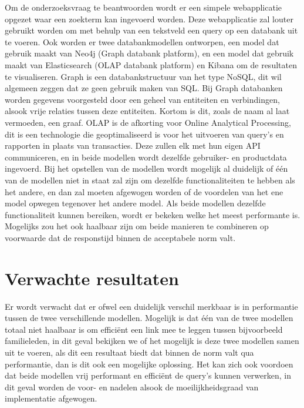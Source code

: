 Om de onderzoeksvraag te beantwoorden wordt er een simpele webapplicatie opgezet waar een zoekterm kan ingevoerd worden. Deze webapplicatie zal louter gebruikt worden om met behulp van een tekstveld een query op een databank uit te voeren. Ook worden er twee databankmodellen ontworpen, een model dat gebruik maakt van Neo4j (Graph databank platform), en een model dat gebruik maakt van Elasticsearch (OLAP databank platform) en Kibana om de resultaten te visualiseren. Graph is een databankstructuur van het type NoSQL, dit wil algemeen zeggen dat ze geen gebruik maken van SQL. Bij Graph databanken worden gegevens voorgesteld door een geheel van entiteiten en verbindingen, alsook vrije relaties tussen deze entiteiten. Kortom is dit, zoals de naam al laat vermoeden, een graaf. OLAP is de afkorting voor Online Analytical Processing, dit is een technologie die geoptimaliseerd is voor het uitvoeren van query's en rapporten in plaats van transacties. Deze zullen elk met hun eigen API communiceren, en in beide modellen wordt dezelfde gebruiker- en productdata ingevoerd. Bij het opstellen van de modellen wordt mogelijk al duidelijk of één van de modellen niet in staat zal zijn om dezelfde functionaliteiten te hebben als het andere, en dan zal moeten afgewogen worden of de voordelen van het ene model opwegen tegenover het andere model. Als beide modellen dezelfde functionaliteit kunnen bereiken, wordt er bekeken welke het meest performante is. Mogelijks zou het ook haalbaar zijn om beide manieren te combineren op voorwaarde dat de responstijd binnen de acceptabele norm valt.


\section{Verwachte resultaten}
\label{sec:verwachte_resultaten}

Er wordt verwacht dat er ofwel een duidelijk verschil merkbaar is in performantie tussen de twee verschillende modellen. Mogelijk is dat één van de twee modellen totaal niet haalbaar is om efficiënt een link mee te leggen tussen bijvoorbeeld familieleden, in dit geval bekijken we of het mogelijk is deze twee modellen samen uit te voeren, als dit een resultaat biedt dat binnen de norm valt qua performantie, dan is dit ook een mogelijke oplossing.
 Het kan zich ook voordoen dat beide modellen vrij performant en efficiënt de query's kunnen verwerken, in dit geval worden de voor- en nadelen alsook de moeilijkheidsgraad van implementatie afgewogen.


